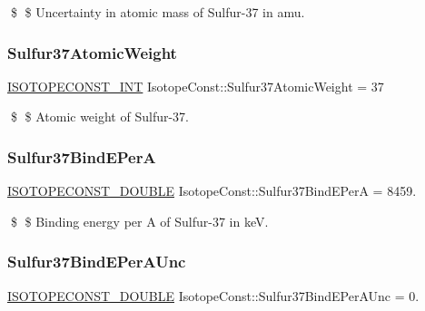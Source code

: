 \$ \$ Uncertainty in atomic mass of Sulfur-\/37 in amu. \mbox{\label{group___isotope_const-_sulfur-_s37_ga7928e190fc1c24b3effb4836ce016307}} 
\subsubsection{\texorpdfstring{Sulfur37\+Atomic\+Weight}{Sulfur37AtomicWeight}}
{\footnotesize\ttfamily \mbox{\hyperlink{group___isotope_const-_macros_ga5f18360b3e99483a35c32d789e62621c}{I\+S\+O\+T\+O\+P\+E\+C\+O\+N\+S\+T\+\_\+\+I\+NT}} Isotope\+Const\+::\+Sulfur37\+Atomic\+Weight = 37}

\$ \$ Atomic weight of Sulfur-\/37. \mbox{\label{group___isotope_const-_sulfur-_s37_ga0c1380628ce47b946021306f22c22fc7}} 
\subsubsection{\texorpdfstring{Sulfur37\+Bind\+E\+PerA}{Sulfur37BindEPerA}}
{\footnotesize\ttfamily \mbox{\hyperlink{group___isotope_const-_macros_ga8f45a7272ce02c0b4c65c44636ed719a}{I\+S\+O\+T\+O\+P\+E\+C\+O\+N\+S\+T\+\_\+\+D\+O\+U\+B\+LE}} Isotope\+Const\+::\+Sulfur37\+Bind\+E\+PerA = 8459.}

\$ \$ Binding energy per A of Sulfur-\/37 in keV. \mbox{\label{group___isotope_const-_sulfur-_s37_ga07c8fc44c3ddc0a7653bcbdbdce31a04}} 
\subsubsection{\texorpdfstring{Sulfur37\+Bind\+E\+Per\+A\+Unc}{Sulfur37BindEPerAUnc}}
{\footnotesize\ttfamily \mbox{\hyperlink{group___isotope_const-_macros_ga8f45a7272ce02c0b4c65c44636ed719a}{I\+S\+O\+T\+O\+P\+E\+C\+O\+N\+S\+T\+\_\+\+D\+O\+U\+B\+LE}} Isotope\+Const\+::\+Sulfur37\+Bind\+E\+Per\+A\+Unc = 0.}

